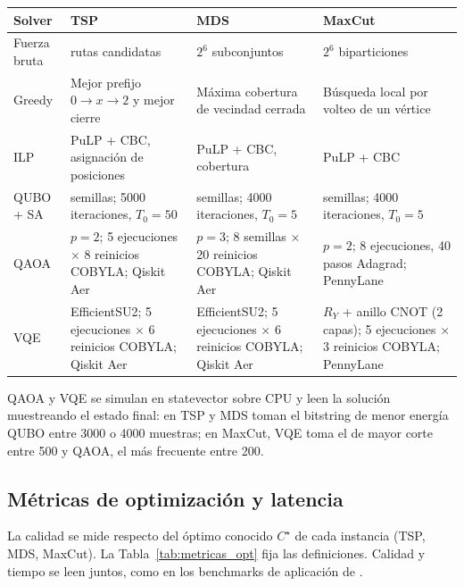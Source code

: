 \begin{center}
\footnotesize
\begin{tabularx}{\linewidth}{@{}>{\raggedright\arraybackslash}p{2.0cm}>{\raggedright\arraybackslash}X>{\raggedright\arraybackslash}X>{\raggedright\arraybackslash}X@{}}
\toprule
\textbf{Solver} & \textbf{TSP} & \textbf{MDS} & \textbf{MaxCut} \\
\midrule
Fuerza bruta & 6 rutas candidatas & $2^6$ subconjuntos & $2^6$ biparticiones \\
Greedy & Mejor prefijo $0\to x\to 2$ y mejor cierre & Máxima cobertura de vecindad cerrada & Búsqueda local por volteo de un vértice \\
ILP \citep{gurobiIlp} & PuLP + CBC, asignación de posiciones & PuLP + CBC, cobertura & PuLP + CBC \\
QUBO + SA & 20 semillas; 5000 iteraciones, $T_0=50$ & 20 semillas; 4000 iteraciones, $T_0=5$ & 20 semillas; 4000 iteraciones, $T_0=5$ \\
QAOA \citep{farhi2014, pennylaneQaoaIntro} & $p=2$; 5 ejecuciones $\times$ 8 reinicios COBYLA; Qiskit Aer & $p=3$; 8 semillas $\times$ 20 reinicios COBYLA; Qiskit Aer & $p=2$; 8 ejecuciones, 40 pasos Adagrad; PennyLane \\
VQE \citep{peruzzo2014} & EfficientSU2; 5 ejecuciones $\times$ 6 reinicios COBYLA; Qiskit Aer & EfficientSU2; 5 ejecuciones $\times$ 6 reinicios COBYLA; Qiskit Aer & $R_Y$ + anillo CNOT (2 capas); 5 ejecuciones $\times$ 3 reinicios COBYLA; PennyLane \\
\bottomrule
\end{tabularx}
\label{tab:solvers}
\end{center}

QAOA y VQE se simulan en statevector sobre CPU y leen la solución muestreando el estado final: en TSP y MDS toman el bitstring de menor energía QUBO entre 3000 o 4000 muestras; en MaxCut, VQE toma el de mayor corte entre 500 y QAOA, el más frecuente entre 200.

\subsection{Métricas de optimización y latencia}

La calidad se mide respecto del óptimo conocido $C^\star$ de cada instancia (TSP, MDS, MaxCut). La Tabla~\ref{tab:metricas_opt} fija las definiciones. Calidad y tiempo se leen juntos, como en los benchmarks de aplicación de \citet{lubinski2024}.

